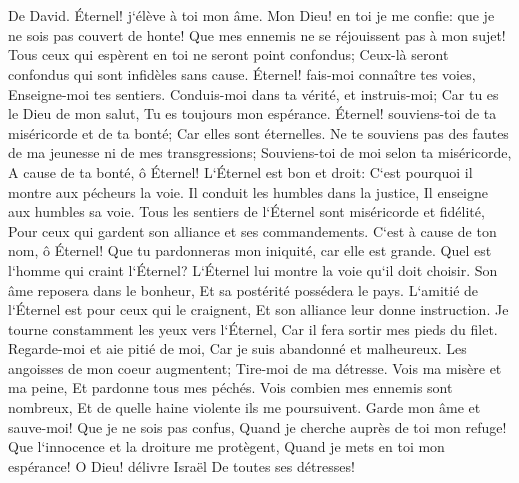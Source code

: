 \chapter{}

\verse De David. Éternel! j`élève à toi mon âme. 
\verse Mon Dieu! en toi je me confie: que je ne sois pas couvert de honte! Que mes ennemis ne se réjouissent pas à mon sujet! 
\verse Tous ceux qui espèrent en toi ne seront point confondus; Ceux-là seront confondus qui sont infidèles sans cause. 
\verse Éternel! fais-moi connaître tes voies, Enseigne-moi tes sentiers. 
\verse Conduis-moi dans ta vérité, et instruis-moi; Car tu es le Dieu de mon salut, Tu es toujours mon espérance. 
\verse Éternel! souviens-toi de ta miséricorde et de ta bonté; Car elles sont éternelles. 
\verse Ne te souviens pas des fautes de ma jeunesse ni de mes transgressions; Souviens-toi de moi selon ta miséricorde, A cause de ta bonté, ô Éternel! 
\verse L`Éternel est bon et droit: C`est pourquoi il montre aux pécheurs la voie. 
\verse Il conduit les humbles dans la justice, Il enseigne aux humbles sa voie. 
\verse Tous les sentiers de l`Éternel sont miséricorde et fidélité, Pour ceux qui gardent son alliance et ses commandements. 
\verse C`est à cause de ton nom, ô Éternel! Que tu pardonneras mon iniquité, car elle est grande. 
\verse Quel est l`homme qui craint l`Éternel? L`Éternel lui montre la voie qu`il doit choisir. 
\verse Son âme reposera dans le bonheur, Et sa postérité possédera le pays. 
\verse L`amitié de l`Éternel est pour ceux qui le craignent, Et son alliance leur donne instruction. 
\verse Je tourne constamment les yeux vers l`Éternel, Car il fera sortir mes pieds du filet. 
\verse Regarde-moi et aie pitié de moi, Car je suis abandonné et malheureux. 
\verse Les angoisses de mon coeur augmentent; Tire-moi de ma détresse. 
\verse Vois ma misère et ma peine, Et pardonne tous mes péchés. 
\verse Vois combien mes ennemis sont nombreux, Et de quelle haine violente ils me poursuivent. 
\verse Garde mon âme et sauve-moi! Que je ne sois pas confus, Quand je cherche auprès de toi mon refuge! 
\verse Que l`innocence et la droiture me protègent, Quand je mets en toi mon espérance! 
\verse O Dieu! délivre Israël De toutes ses détresses! 

\chapter{}

